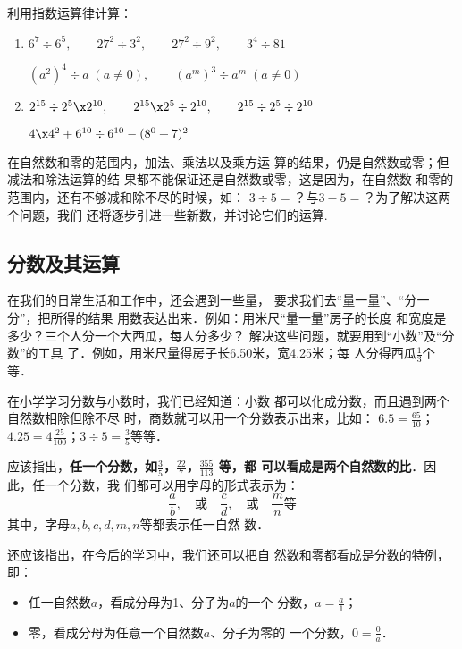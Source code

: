 \begin{ex}
	利用指数运算律计算：
	\begin{enumerate}
		\item $6^7\div 6^5,\qquad 27^2\div 3^2,\qquad 27^2\div 9^2,\qquad 3^4\div 81$
		
		$(a^2)^4\div a\; (a\ne 0),\qquad (a^m)^3\div a^m\; (a\ne 0)$
		\item $2^{15}\div 2^5\x 2^{10},\qquad 2^{15}\x 2^5\div 2^{10},\qquad 2^{15}\div 2^5\div 2^{10}$
		
		$4\x 4^2 +6^{10}\div 6^{10}-(8^0+7)^2$
	\end{enumerate}
\end{ex}

在自然数和零的范围内，加法、乘法以及乘方运
算的结果，仍是自然数或零；但减法和除法运算的结
果都不能保证还是自然数或零，这是因为，在自然数
和零的范围内，还有不够减和除不尽的时候，如：
$3\div 5=$？与$3-5=$？为了解决这两个问题，我们
还将逐步引进一些新数，并讨论它们的运算.

\subsection{分数及其运算}

在我们的日常生活和工作中，还会遇到一些量，
要求我们去“量一量”、“分一分”，把所得的结果
用数表达出来．例如：用米尺“量一量”房子的长度
和宽度是多少？三个人分一个大西瓜，每人分多少？
解决这些问题，就要用到“小数”及“分数”的工具
了．例如，用米尺量得房子长6.50米，宽4.25米；每
人分得西瓜$\frac{1}{3}$个等．

在小学学习分数与小数时，我们已经知道：小数
都可以化成分数，而且遇到两个自然数相除但除不尽
时，商数就可以用一个分数表示出来，比如：
$6.5=\frac{65}{10}$；$4.25=4\frac{25}{100}$；$3\div 5=\frac{3}{5}$等等．

应该指出，\textbf{任一个分数，如$\frac{3}{5}$，$\frac{22}{7}$，$\frac{355}{113}$
	等，都
	可以看成是两个自然数的比}．因此，任一个分数，我
们都可以用字母的形式表示为：
\[\frac{a}{b},\quad \text{或}\quad \frac{c}{d}, \quad \text{或} \quad \frac{m}{n} \text{等} \]
其中，字母$a, b, c, d, m,n$等都表示任一自然
数．

还应该指出，在今后的学习中，我们还可以把自
然数和零都看成是分数的特例，即：
\begin{itemize}
	\item 任一自然数$a$，看成分母为1、分子为$a$的一个
	分数，$a=\frac{a}{1}$；
	\item 零，看成分母为任意一个自然数$a$、分子为零的
	一个分数，$0=\frac{0}{a}$．
\end{itemize}

